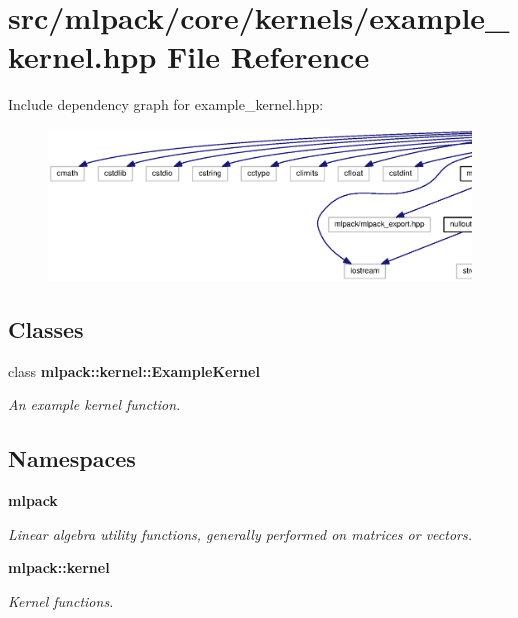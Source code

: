 \section{src/mlpack/core/kernels/example\+\_\+kernel.hpp File Reference}
\label{example__kernel_8hpp}
Include dependency graph for example\+\_\+kernel.\+hpp\+:
\nopagebreak
\begin{figure}[H]
\begin{center}
\leavevmode
\includegraphics[width=350pt]{example__kernel_8hpp__incl}
\end{center}
\end{figure}
\subsection*{Classes}
\begin{DoxyCompactItemize}
\item 
class {\bf mlpack\+::kernel\+::\+Example\+Kernel}
\begin{DoxyCompactList}\small\item\em An example kernel function. \end{DoxyCompactList}\end{DoxyCompactItemize}
\subsection*{Namespaces}
\begin{DoxyCompactItemize}
\item 
 {\bf mlpack}
\begin{DoxyCompactList}\small\item\em Linear algebra utility functions, generally performed on matrices or vectors. \end{DoxyCompactList}\item 
 {\bf mlpack\+::kernel}
\begin{DoxyCompactList}\small\item\em Kernel functions. \end{DoxyCompactList}\end{DoxyCompactItemize}


